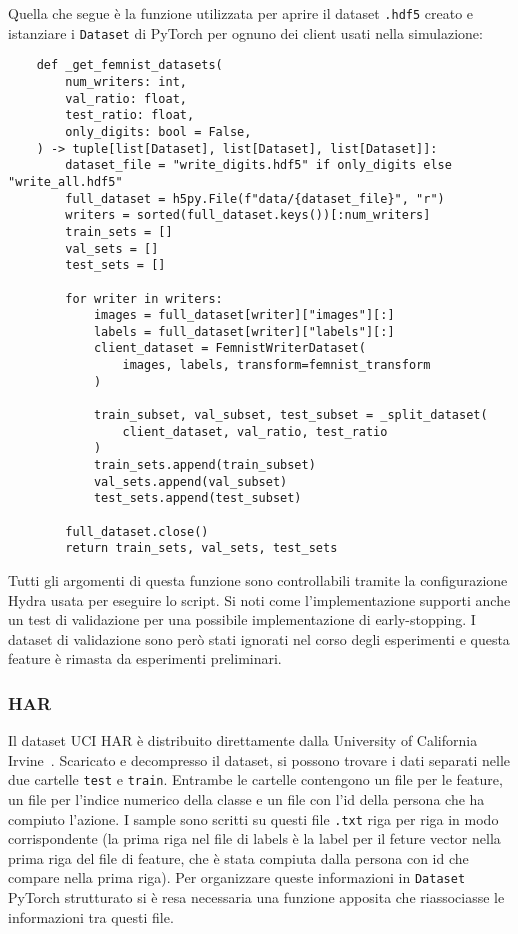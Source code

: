 Quella che segue è la funzione
utilizzata per aprire il dataset \texttt{.hdf5} creato 
e istanziare i \texttt{Dataset} di PyTorch per ognuno dei client usati nella
simulazione:
\clearpage
\begin{lstlisting}
    def _get_femnist_datasets(
        num_writers: int,
        val_ratio: float,
        test_ratio: float,
        only_digits: bool = False,
    ) -> tuple[list[Dataset], list[Dataset], list[Dataset]]:    
        dataset_file = "write_digits.hdf5" if only_digits else "write_all.hdf5"
        full_dataset = h5py.File(f"data/{dataset_file}", "r")
        writers = sorted(full_dataset.keys())[:num_writers]
        train_sets = []
        val_sets = []
        test_sets = []
    
        for writer in writers:
            images = full_dataset[writer]["images"][:]
            labels = full_dataset[writer]["labels"][:]
            client_dataset = FemnistWriterDataset(
                images, labels, transform=femnist_transform
            )
    
            train_subset, val_subset, test_subset = _split_dataset(
                client_dataset, val_ratio, test_ratio
            )
            train_sets.append(train_subset)
            val_sets.append(val_subset)
            test_sets.append(test_subset)
    
        full_dataset.close()
        return train_sets, val_sets, test_sets
\end{lstlisting}
Tutti gli argomenti di questa funzione sono controllabili tramite la
configurazione Hydra usata per eseguire lo script. Si noti come
l'implementazione supporti anche un test di validazione per una 
possibile implementazione di early-stopping. I dataset di validazione 
sono però stati ignorati nel corso degli esperimenti e questa feature 
è rimasta da esperimenti preliminari.

\subsubsection{HAR}
Il dataset UCI HAR è distribuito direttamente dalla University of 
California Irvine~\cite{uci_har_ds}. Scaricato e decompresso il 
dataset, si possono trovare i dati separati nelle due cartelle 
\texttt{test} e \texttt{train}. Entrambe le cartelle contengono un 
file per le feature, un file per l'indice numerico della classe e un 
file con l'id della persona che ha compiuto l'azione. I sample sono 
scritti su questi file \texttt{.txt} riga per riga in modo 
corrispondente (la prima riga nel file di labels è la label per il 
feture vector nella prima riga del file di feature, che è stata 
compiuta dalla persona con id che compare nella prima riga). Per 
organizzare queste informazioni in \texttt{Dataset} PyTorch strutturato 
si è resa necessaria una funzione apposita che riassociasse le 
informazioni tra questi file.

